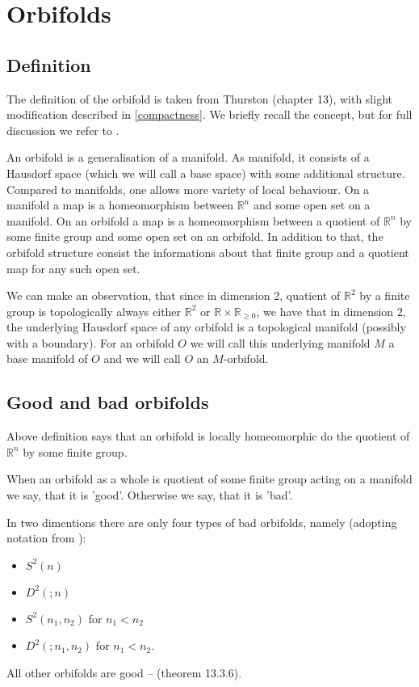 \section{Orbifolds}
\subsection{Definition}
The definition of the orbifold is taken from Thurston \cite{Thurston1979} (chapter 13), 
with slight modification described in \ref{compactness}. 
We briefly recall the concept, but for full discussion we refer to \cite{Thurston1979}. 

An orbifold is a generalisation of a manifold. As manifold, it consists of a Hausdorf space 
(which we will call a base space)
with some additional structure. 
Compared to manifolds, one allows more variety of local behaviour. 
On a manifold a map is a homeomorphism between $\mathbb{R}^n$ and some open set on a manifold. 
On an orbifold a map is a homeomorphism between a quotient of $\mathbb{R}^n$ by some 
finite group and some open set on an orbifold. 
In addition to that, the orbifold structure consist the informations about that finite group 
and a quotient map for any such open set. 

We can make an observation, that since in dimension 2, quatient of $\mathbb{R}^2$ by a finite 
group is topologically always either $\mathbb{R}^2$ or $\mathbb{R}\times\mathbb{R}_{\geq 0}$, 
we have that in dimension 2, the underlying Hausdorf space of any orbifold is a topological 
manifold (possibly with a boundary). For an orbifold $O$ we will call this underlying manifold $M$
a base manifold of $O$ and we will call $O$ an $M$-orbifold.  

\subsection{Good and bad orbifolds}
Above definition says that an orbifold is locally homeomorphic do the quotient of $\mathbb{R}^n$ 
by some finite group. 

When an orbifold as a whole is quotient of some finite group acting on a manifold we say, that 
it is 'good'. Otherwise we say, that it is 'bad'. 


In two dimentions there are only four types of bad orbifolds, namely
(adopting notation from \cite{Thurston1979}): 
\begin{itemize}
\item $S^2(n)$ 
\item $D^2(;n)$ 
\item $S^2(n_1,n_2)$ for $n_1 < n_2$ 
\item $D^2(;n_1,n_2)$ for $n_1 < n_2$. 
\end{itemize}
All other orbifolds are good -- \cite{Thurston1979} (theorem 13.3.6).

